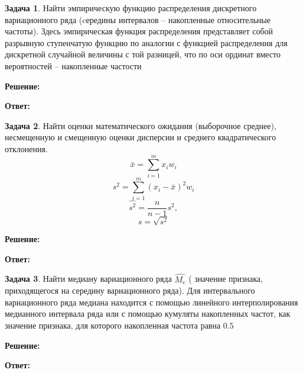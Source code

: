 \documentclass[a4paper,12pt]{article}
\theoremstyle{definition}
\newtheorem{problem}{Задача}
\newenvironment{solution}
{\begin{shaded}\textbf{Решение:}\par\setlength{\parindent}{0pt}}
{\end{shaded}}
\newenvironment{answer}
{\par\noindent\textbf{Ответ:} }
{\par}
\begin{document}
\vspace{8pt}
\begin{problem}
    Найти эмпирическую функцию распределения дискретного вариационного ряда
    (cередины интервалов – накопленные относительные частоты).
    Здесь эмпирическая функция распределения представляет собой разрывную
    ступенчатую функцию по аналогии с функцией распределения для дискретной
    случайной величины с той разницей, что по оси ординат вместо вероятностей –
    накопленные частости
    
        \begin{solution}
        \end{solution}
    
        \begin{answer}
        \end{answer}
    
    \end{problem}



\vspace{8pt}
\begin{problem}
    Найти оценки математического ожидания (выборочное среднее), несмещенную и
    смещенную оценки дисперсии и среднего квадратического отклонения.
    \[\bar{x} = \sum^m_{i=1} x_i w_i\]
    \[s^2 = \sum^m_{i=1}(x_i - \bar{x})^2 w_i\]
    \[\hat{s^2} = \frac{n}{n-1} s^2, \]
    \[s = \sqrt{s^2}\]
    
        \begin{solution}
        \end{solution}
    
        \begin{answer}
        \end{answer}
    
    \end{problem}


\vspace{8pt}
\begin{problem}
    Найти медиану вариационного ряда \(\hat{M_e}\) ( значение признака, приходящегося на
    середину вариационного ряда). Для интервального вариационного ряда медиана
    находится с помощью линейного интерполирования медианного интервала ряда
    или с помощью кумуляты накопленных частот, как значение признака, для
    которого накопленная частота равна \(0.5\)
    
        \begin{solution}
        \end{solution}
    
        \begin{answer}
        \end{answer}
    
    \end{problem}
\end{document}
